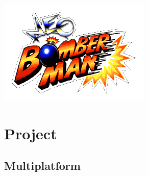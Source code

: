 \documentclass {beamer}                                                                                         %
\begin{document}
{\begin {minipage} [c] {.46\linewidth}
\end {minipage}                                                                                                 %
\hfill                                                                                                          %
\begin {minipage} [c] {.46\linewidth}                                                                           %
    \centering                                                                                                  %
    \includegraphics [scale=.50] {content/info.png}                                                         %
\end {minipage}                                                                                                 %
}                                                                                                               %
\section {Project}                                                                                   %
\subsection {Multiplatform}                                                                  %
\end{document}
